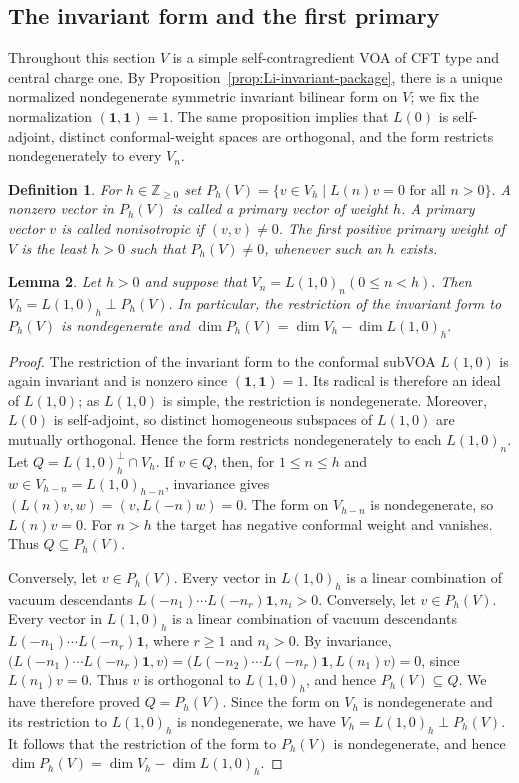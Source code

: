 \documentclass[12pt,leqno]{amsart}
\numberwithin{equation}{section} \newtheorem{thm}{Theorem}[section] \newtheorem{lem}[thm]{Lemma} \newtheorem{ex}[thm]{Example} \newtheorem{prop}[thm]{Proposition} \newtheorem{cor}[thm]{Corollary} \newtheorem{defi}[thm]{Definition} \newtheorem{rmk}[thm]{Remark} \newtheorem{notation}[thm]{Notation}
\newcommand{\one}{\mathbf{1}}
\def\Z{\mathbb{Z}} \def\N{\mathbb{N}} \def\A{\mathbb{A}} \def\C{\mathbb{C}} \def\R{\mathbb{R}} \def\Q{\mathbb{Q}} \def\F{\mathbb{F}}
\begin{document}
\subsection{The invariant form and the first primary}

Throughout this section $V$ is a simple self-contragredient VOA of CFT type and central charge one. By Proposition~\ref{prop:Li-invariant-package}, there is a unique normalized nondegenerate symmetric invariant bilinear form on $V$; we fix the normalization $(\one,\one)=1$. The same proposition implies that $L(0)$ is self-adjoint, distinct conformal-weight spaces are orthogonal, and the form restricts nondegenerately to every $V_n$.

\begin{defi}
For $h\in\Z_{\ge0}$ set \(P_h(V)=\{v\in V_h\mid L(n)v=0\text{ for all }n>0\}.\) A nonzero vector in \(P_h(V)\) is called a primary vector of weight $h$. A primary vector $v$ is called nonisotropic if \((v,v)\ne0\). The first positive primary weight of $V$ is the least $h>0$ such that \(P_h(V)\ne0\), whenever such an $h$ exists.
\end{defi}

\begin{lem}\label{lem:primary-complement}
Let $h>0$ and suppose that \(V_n=L(1,0)_n(0\le n<h).\) Then \(V_h=L(1,0)_h\mathbin{\perp}P_h(V).\) In particular, the restriction of the invariant form to $P_h(V)$ is nondegenerate and \(\dim P_h(V)=\dim V_h-\dim L(1,0)_h.\)
\end{lem}

\begin{proof}
The restriction of the invariant form to the conformal subVOA \(L(1,0)\) is again invariant and is nonzero since \((\one,\one)=1\). Its radical is therefore an ideal of \(L(1,0)\); as \(L(1,0)\) is simple, the restriction is nondegenerate. Moreover, \(L(0)\) is self-adjoint, so distinct homogeneous subspaces of \(L(1,0)\) are mutually orthogonal. Hence the form restricts nondegenerately to each \(L(1,0)_n\). Let $Q=L(1,0)_h^\perp\cap V_h$. If $v\in Q$, then, for $1\le n\le h$ and $w\in V_{h-n}=L(1,0)_{h-n}$, invariance gives \((L(n)v,w)=(v,L(-n)w)=0.\) The form on $V_{h-n}$ is nondegenerate, so $L(n)v=0$. For $n>h$ the target has negative conformal weight and vanishes. Thus $Q\subseteq P_h(V)$.

Conversely, let $v\in P_h(V)$. Every vector in $L(1,0)_h$ is a linear combination of vacuum descendants \(L(-n_1)\cdots L(-n_r)\one,n_i>0.\) Conversely, let \(v\in P_h(V)\). Every vector in \(L(1,0)_h\) is a linear combination of vacuum descendants \(L(-n_1)\cdots L(-n_r)\one\), where \(r\ge1\) and \(n_i>0\). By invariance, \(\bigl(L(-n_1)\cdots L(-n_r)\one,v\bigr)=\bigl(L(-n_2)\cdots L(-n_r)\one,L(n_1)v\bigr)=0\), since \(L(n_1)v=0\). Thus \(v\) is orthogonal to \(L(1,0)_h\), and hence \(P_h(V)\subseteq Q\). We have therefore proved $ Q=P_h(V). $ Since the form on \(V_h\) is nondegenerate and its restriction to \(L(1,0)_h\) is nondegenerate, we have $ V_h=L(1,0)_h\mathbin{\perp}P_h(V). $ It follows that the restriction of the form to \(P_h(V)\) is nondegenerate, and hence $ \dim P_h(V)=\dim V_h-\dim L(1,0)_h. $
\end{proof}
\end{document}
